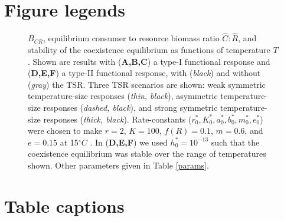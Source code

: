 \documentclass[11pt]{article}
\begin{document}
\section*{Figure legends}

\begin{figure}[!ht]
\centering
\caption{
$B_{CR}$, equilibrium consumer to resource biomass ratio $\hat{C}:\hat{R}$, and stability of the coexistence equilibrium as functions of temperature $T$.
Shown are results with (\textbf{A,B,C}) a type-I functional response and (\textbf{D,E,F}) a type-II functional response, with (\textit{black}) and without (\textit{gray}) the TSR.
Three TSR scenarios are shown: weak symmetric temperature-size responses (\textit{thin, black}), asymmetric temperature-size responses (\textit{dashed, black}), and strong symmetric temperature-size responses (\textit{thick, black}).
Rate-constants ($r_0^*,K_0^*,a_0^*,b_0^*,m_0^*,e_0^*$) were chosen to make $r = 2$, $K = 100$, $f(R) = 0.1$, $m = 0.6$, and $e = 0.15$ at 15$^\circ C$ \citep[as in Figure 3 of][]{Gilbert2014}.
In (\textbf{D,E,F}) we used $h_0^* = 10^{-13}$ such that the coexistence equilibrium was stable over the range of temperatures shown.
Other parameters given in Table \ref{params}.
}
\label{bigfig}
\end{figure}

\newpage
\section*{Table captions}
\end{document}
